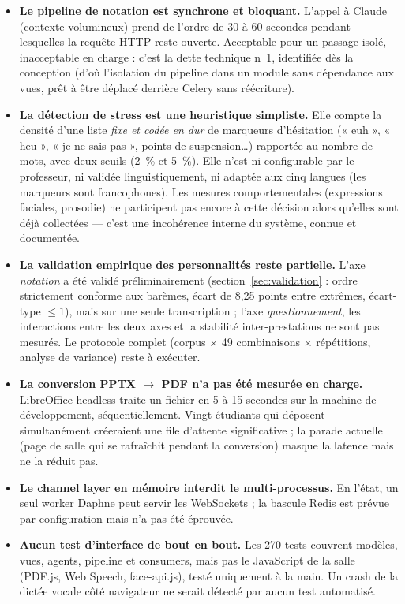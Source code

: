 \documentclass[12pt,a4paper]{report}
\begin{document}
\begin{itemize}
  \item \textbf{Le pipeline de notation est synchrone et bloquant.} L'appel à
        Claude (contexte volumineux) prend de l'ordre de 30 à 60 secondes
        pendant lesquelles la requête HTTP reste ouverte. Acceptable pour un
        passage isolé, inacceptable en charge : c'est la dette technique
        n~1, identifiée dès la conception (d'où l'isolation du pipeline
        dans un module sans dépendance aux vues, prêt à être déplacé derrière
        Celery sans réécriture).
  \item \textbf{La détection de stress est une heuristique simpliste.} Elle
        compte la densité d'une liste \emph{fixe et codée en dur} de marqueurs
        d'hésitation (« euh », « heu », « je ne sais pas », points de
        suspension…) rapportée au nombre de mots, avec deux seuils (2~\% et
        5~\%). Elle n'est ni configurable par le professeur, ni validée
        linguistiquement, ni adaptée aux cinq langues (les marqueurs sont
        francophones). Les mesures comportementales (expressions faciales,
        prosodie) ne participent pas encore à cette décision alors qu'elles
        sont déjà collectées --- c'est une incohérence interne du système,
        connue et documentée.
  \item \textbf{La validation empirique des personnalités reste partielle.}
        L'axe \emph{notation} a été validé préliminairement
        (section~\ref{sec:validation} : ordre strictement conforme aux
        barèmes, écart de 8{,}25 points entre extrêmes, écart-type $\leq 1$),
        mais sur une seule transcription ; l'axe \emph{questionnement}, les
        interactions entre les deux axes et la stabilité inter-prestations ne
        sont pas mesurés. Le protocole complet (corpus $\times$ 49
        combinaisons $\times$ répétitions, analyse de variance) reste à
        exécuter.
  \item \textbf{La conversion PPTX $\to$ PDF n'a pas été mesurée en charge.}
        LibreOffice headless traite un fichier en 5 à 15 secondes sur la
        machine de développement, séquentiellement. Vingt étudiants qui
        déposent simultanément créeraient une file d'attente significative ;
        la parade actuelle (page de salle qui se rafraîchit pendant la
        conversion) masque la latence mais ne la réduit pas.
  \item \textbf{Le channel layer en mémoire interdit le multi-processus.} En
        l'état, un seul worker Daphne peut servir les WebSockets ; la bascule
        Redis est prévue par configuration mais n'a pas été éprouvée.
  \item \textbf{Aucun test d'interface de bout en bout.} Les 270 tests
        couvrent modèles, vues, agents, pipeline et consumers, mais pas le
        JavaScript de la salle (PDF.js, Web Speech, face-api.js), testé
        uniquement à la main. Un crash de la dictée vocale côté navigateur ne
        serait détecté par aucun test automatisé.
\end{itemize}
\end{document}
